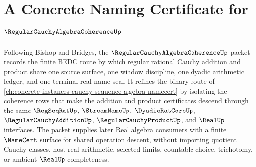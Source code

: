 \chapter{A Concrete Naming Certificate for $\RegularCauchyAlgebraCoherenceUp$}
\label{ch:concrete-instances-regular-cauchy-algebra-coherence-namecert}

Following Bishop and Bridges, the $\RegularCauchyAlgebraCoherenceUp$ packet records the finite BEDC route by which regular rational Cauchy addition and product share one source surface, one window discipline, one dyadic arithmetic ledger, and one terminal real-name seal. It refines the binary route of \autoref{ch:concrete-instances-cauchy-sequence-algebra-namecert} by isolating the coherence rows that make the addition and product certificates descend through the same $\RegSeqRatUp$, $\StreamNameUp$, $\DyadicRatCoreUp$, $\RegularCauchyAdditionUp$, $\RegularCauchyProductUp$, and $\RealUp$ interfaces. The packet supplies later Real algebra consumers with a finite $\NameCert$ surface for shared operation descent, without importing quotient Cauchy classes, host real arithmetic, selected limits, countable choice, trichotomy, or ambient $\RealUp$ completeness.

